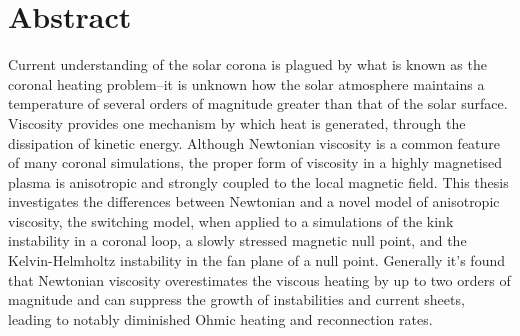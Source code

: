 \chapter{Abstract}

Current understanding of the solar corona is plagued by what is known as the coronal heating problem--it is unknown how the solar atmosphere maintains a temperature of several orders of magnitude greater than that of the solar surface. Viscosity provides one mechanism by which  heat is generated, through the dissipation of kinetic energy. Although Newtonian viscosity is a common feature of many coronal simulations, the proper form of viscosity in a highly magnetised plasma is anisotropic and strongly coupled to the local magnetic field. This thesis investigates the differences between Newtonian and a novel model of anisotropic viscosity, the switching model, when applied to a simulations of the kink instability in a coronal loop, a slowly stressed magnetic null point, and the Kelvin-Helmholtz instability in the fan plane of a null point. Generally it's found that Newtonian viscosity overestimates the viscous heating by up to two orders of magnitude and can suppress the growth of instabilities and current sheets, leading to notably diminished Ohmic heating and reconnection rates.
